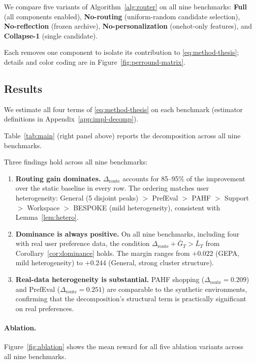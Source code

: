 \documentclass{article} %
\begin{document}
We compare five variants of Algorithm~\ref{alg:router} on all nine benchmarks: \textbf{Full} (all components enabled), \textbf{No-routing} (uniform-random candidate selection), \textbf{No-reflection} (frozen archive), \textbf{No-personalization} (onehot-only features), and \textbf{Collapse-1} (single candidate).

Each removes one component to isolate its contribution to \eqref{eq:method-thesis}; details and color coding are in Figure~\ref{fig:perround-matrix}.

\subsection{Results}

\label{sec:exp-results}

We estimate all four terms of \eqref{eq:method-thesis} on each benchmark (estimator definitions in Appendix~\ref{app:impl-decomp}).

Table~\ref{tab:main} (right panel above) reports the decomposition across all nine benchmarks.

Three findings hold across all nine benchmarks:

\begin{enumerate}
\item \textbf{Routing gain dominates.} $\Delta_{\mathrm{route}}$ accounts for 85--95\% of the improvement over the static baseline in every row. The ordering matches user heterogeneity: General (5 disjoint peaks) $>$ PrefEval $>$ PAHF $>$ Support $>$ Workspace $>$ BESPOKE (mild heterogeneity), consistent with Lemma~\ref{lem:hetero}.
\item \textbf{Dominance is always positive.} On all nine benchmarks, including four with real user preference data, the condition $\Delta_{\mathrm{route}}+\bar G_T>\bar L_T$ from Corollary~\ref{cor:dominance} holds. The margin ranges from $+0.022$ (GEPA, mild heterogeneity) to $+0.244$ (General, strong cluster structure).
\item \textbf{Real-data heterogeneity is substantial.} PAHF shopping ($\Delta_{\mathrm{route}}{=}0.209$) and PrefEval ($\Delta_{\mathrm{route}}{=}0.251$) are comparable to the synthetic environments, confirming that the decomposition's structural term is practically significant on real preferences.
\end{enumerate}

\paragraph{Ablation.} Figure~\ref{fig:ablation} shows the mean reward for all five ablation variants across all nine benchmarks.
\end{document}

